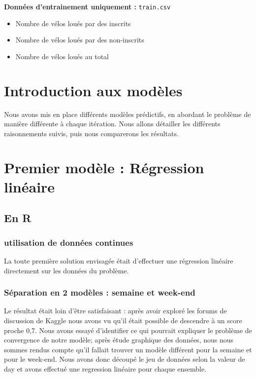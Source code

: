 \textbf{Données d'entrainement uniquement : } \verb|train.csv|

\begin{itemize}[label=$\circ$]
\item Nombre de vélos loués par des inscrits
\item Nombre de vélos loués par des non-inscrits
\item Nombre de vélos loués au total
\end{itemize}

\section{Introduction aux modèles}

Nous avons mis en place différents modèles prédictifs, en abordant le problème de manière différente à chaque itération. Nous allons détailler les différents raisonnements suivis, puis nous comparerons les résultats.

\section{Premier modèle : Régression linéaire}

\subsection{En R}

\subsubsection{utilisation de données continues}

La toute première solution envisagée était d'effectuer une régression linéaire directement sur les données du problème.

\subsubsection{Séparation en 2 modèles : semaine et week-end}

Le résultat était loin d'être satisfaisant : après avoir exploré les forums de discussion de Kaggle nous avons vu qu'il était possible de descendre à un score proche 0,7. Nous avons essayé d'identifier ce qui pourrait expliquer le problème de convergence de notre modèle; après étude graphique des données, nous nous sommes rendus compte qu'il fallait trouver un modèle différent pour la semaine et pour le week-end. Nous avons donc découpé le jeu de données selon la valeur de day et avons effectué une regression linéaire pour chaque ensemble.

